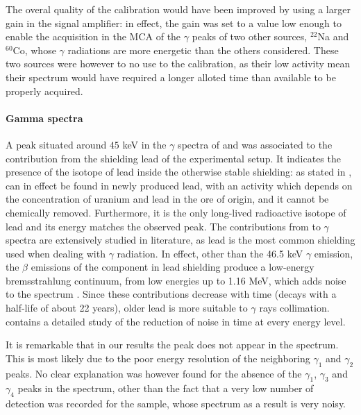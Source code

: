 The overal quality of the calibration would have been improved by using a larger  gain in the signal amplifier:
in effect, the gain was set to a value low enough to enable the acquisition in the MCA of the $\gamma$ peaks of two other sources, $^{22}$Na and $^{60}$Co, whose $\gamma$ radiations are more energetic than the others considered.
These two sources were however to no use to the calibration, as their low activity mean their spectrum would have required a longer alloted time than available to be properly acquired.

\paragraph{Gamma spectra}
A peak situated around $45$ keV in the $\gamma$ spectra of \cesium and \hafnium was associated to the contribution from the shielding lead of the experimental setup.
It indicates the presence of the \lead isotope of lead inside the otherwise stable shielding:
as stated in \cite{korun_influence_2009}, \lead can in effect be found in newly produced lead, with an activity which depends on the concentration of uranium and lead in the ore of origin, and it cannot be chemically removed.
Furthermore, it is the only long-lived radioactive isotope of lead and its energy matches the observed peak.
The contributions from \lead to $\gamma$ spectra are extensively studied in literature, as lead is the most common shielding used when dealing with $\gamma$ radiation.
In effect, other than the 46.5 keV $\gamma$ emission, the $\beta$ emissions of the \lead component in lead shielding produce a low-energy bremsstrahlung
continuum, from low energies up to 1.16 MeV, which adds noise to the spectrum \cite{smith_evaluation_2008}.
Since these contributions decrease with time (\lead decays with a half-life of about 22 years), older lead is more suitable to $\gamma$ rays collimation.
\cite{korun_influence_2009} contains a detailed study of the reduction of noise in time at every energy level.

It is remarkable that in our results the \lead peak does not appear in the \cobalt spectrum. 
This is most likely due to the poor energy resolution of the neighboring $\gamma_1$ and $\gamma_2$ peaks.
No clear explanation was however found for the absence of the $\gamma_1$, $\gamma_3$ and $\gamma_4$ peaks in the \hafnium spectrum, other than the fact that a very low number of detection was recorded for the sample, whose spectrum as a result is very noisy.

